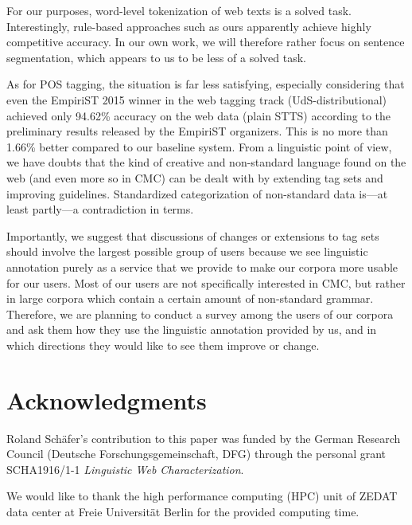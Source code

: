\documentclass[11pt]{article}
\begin{document}
For our purposes, word-level tokenization of web texts is a solved task.
Interestingly, rule-based approaches such as ours apparently achieve highly competitive accuracy.
In our own work, we will therefore rather focus on sentence segmentation, which appears to us to be less of a solved task.

As for POS tagging, the situation is far less satisfying, especially considering that even the EmpiriST 2015 winner in the web tagging track (UdS-distributional) achieved only 94.62\% accuracy on the web data (plain STTS) according to the preliminary results released by the EmpiriST organizers.
This is no more than 1.66\% better compared to our baseline system.
From a linguistic point of view, we have doubts that the kind of creative and non-standard language found on the web (and even more so in CMC) can be dealt with by extending tag sets and improving guidelines.
Standardized categorization of non-standard data is---at least partly---a contradiction in terms.

Importantly, we suggest that discussions of changes or extensions to tag sets should involve the largest possible group of users because we see linguistic annotation purely as a service that we provide to make our corpora more usable for our users.
Most of our users are not specifically interested in CMC, but rather in large corpora which contain a certain amount of non-standard grammar.
Therefore, we are planning to conduct a survey among the users of our corpora and ask them how they use the linguistic annotation provided by us, and in which directions they would like to see them improve or change.

\section*{Acknowledgments}

Roland Schäfer's contribution to this paper was funded by the German Research Council (Deutsche Forschungsgemeinschaft, DFG) through the personal grant SCHA1916/1-1 \textit{Linguistic Web Characterization}.

We would like to thank the high performance computing (HPC) unit of ZEDAT data center at Freie Universität Berlin for the provided computing time.




\end{document}
